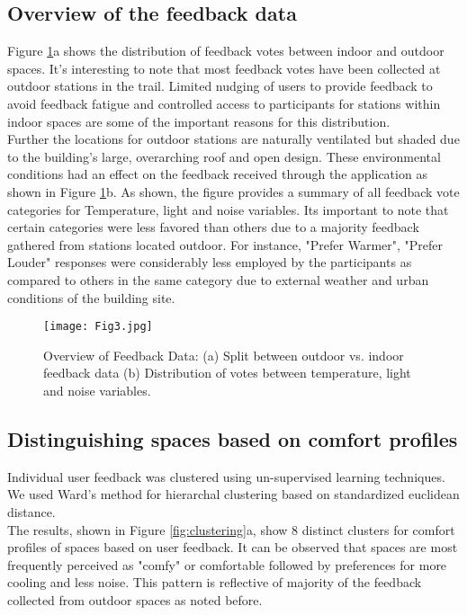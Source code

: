 


\subsection{Overview of the feedback data}

Figure \ref{fig:feedbackdata}a shows the distribution of feedback votes between indoor and outdoor spaces. It's interesting to note that most feedback votes have been collected at outdoor stations in the trail. Limited nudging of users to provide feedback to avoid feedback fatigue \cite{EffectsFeedbackFatigue} and controlled access to participants for stations within indoor spaces are some of the important reasons for this distribution.\\

Further the locations for outdoor stations are naturally ventilated but shaded due to the building's large, overarching roof and open design. These environmental conditions had an effect on the feedback received through the application as shown in Figure \ref{fig:feedbackdata}b.  As shown, the figure provides a summary of all feedback vote categories for Temperature, light and noise variables. Its important to note that certain categories were less favored than others due to a majority feedback gathered from stations located outdoor. For instance, "Prefer Warmer", "Prefer Louder" responses were considerably less employed by the participants as compared to others in the same category due to external weather and urban conditions of the building site.\\    


\begin{figure}
\begin{center}
\texttt{[image: Fig3.jpg]}
\caption{Overview of Feedback Data: (a) Split between outdoor vs. indoor feedback data (b) Distribution of votes between temperature, light and noise variables.}
\label{fig:feedbackdata}
\end{center}
\end{figure}


\subsection{Distinguishing spaces based on comfort profiles}
\label{ch:userResults}

Individual user feedback was clustered using un-supervised learning techniques. We used Ward's method for hierarchal clustering based on standardized euclidean distance.\\
The results, shown in Figure \ref{fig:clustering}a, show 8 distinct clusters for comfort profiles of spaces based on user feedback. It can be observed that spaces are most frequently perceived as "comfy" or comfortable followed by preferences for more cooling and less noise. This pattern is reflective of majority of the feedback collected from outdoor spaces as noted before.\\

